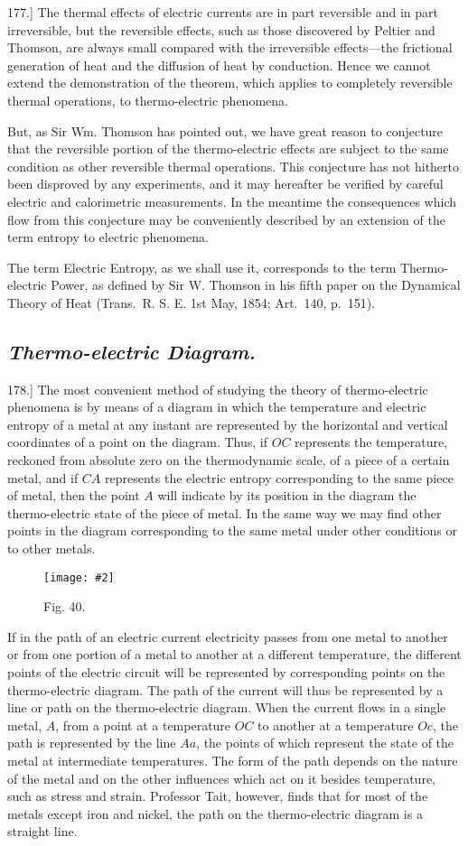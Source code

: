 \documentclass[12pt,oneside]{book}[2021/10/04]
\newcommand{\Heading}{\centering\normalfont}
\newcommand{\Subsection}[1]{\subsection*{\normalsize\Heading\itshape #1}}
\newcommand{\Runhead}[1]{\fancyhead[C]{\iffloatpage{}{\small#1}}}
\newcommand{\article}[1]{\phantomsection \label{art:#1}{#1.]}}
\newcommand{\widefig}[3]{
\begin{figure}[ht!]
\centering
\texttt{[image: \#2]}
\caption*{\small #3}
\end{figure}}
\newcommand{\¬}{\hphantom{0}}
\begin{document}
\article{177} The thermal effects of electric currents are in part reversible
and in part irreversible, but the reversible effects, such as
those discovered by Peltier and Thomson, are always small compared
with the irreversible effects---the frictional generation of heat
and the diffusion of heat by conduction. Hence we cannot extend
the demonstration of the theorem, which applies to completely reversible
thermal operations, to thermo-electric phenomena.

But, as Sir Wm. Thomson has pointed out, we have great
reason to conjecture that the reversible portion of the thermo-electric
effects are subject to the same condition as other reversible thermal
operations. This conjecture has not hitherto been disproved by any
experiments, and it may hereafter be verified by careful electric and
calorimetric measurements. In the meantime the consequences which
flow from this conjecture may be conveniently described by an extension
of the term entropy to electric phenomena.

The term Electric Entropy, as we shall use it, corresponds to the
term Thermo-electric Power, as defined by Sir W. Thomson in his
fifth paper on the Dynamical Theory of Heat (Trans.\ R. S. E.
1st May, 1854; Art.\ 140, p.\ 151).

\Subsection{Thermo-electric Diagram.}

\article{178} The most convenient method of studying the theory of
thermo-electric phenomena is by means of a diagram in which the
temperature and electric entropy of a metal at any instant are
represented by the horizontal and vertical coordinates of a point
on the diagram. Thus, if \(OC\) represents the temperature, reckoned
from absolute zero on the thermodynamic scale, of a piece of a
certain metal, and if \(CA\) represents the electric entropy corresponding
to the same piece of metal, then the point \(A\) will indicate
by its position in the diagram the thermo-electric state of the piece
of metal. In the same way we may find other points in the
diagram corresponding to the same metal under other conditions or
to other metals.

\widefig{0.73}{157.png}{Fig. 40.}
\Runhead{THERMO-ELECTRIC DIAGRAM.}
If in the path of an electric current electricity passes from one
metal to another or from one portion of a metal to another at
a different temperature, the different points of the electric circuit
will be represented by corresponding points on the thermo-electric
diagram. The path of the current will thus be represented by
a line or path on the thermo-electric diagram. When the current
flows in a single metal, \(A\), from a point at a temperature \(OC\) to
another at a temperature \(Oc\), the path is represented by the line \(Aa\),
the points of which represent the state of the metal at intermediate
temperatures. The form of the path depends on the nature of
the metal and on the other influences which act on it besides
temperature, such as stress and strain. Professor Tait, however,
finds that for most of the metals except iron and nickel, the path
on the thermo-electric diagram is a straight line.
\end{document}
